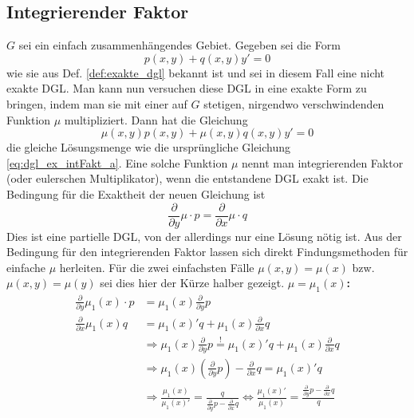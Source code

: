 	\subsection{Integrierender Faktor}
	$G$ sei ein einfach zusammenhängendes Gebiet. Gegeben sei die Form
	\begin{equation}
		p(x,y) + q(x,y)y' = 0 \label{eq:dgl_ex_intFakt_a}
	\end{equation} 
	wie sie aus Def. \ref{def:exakte_dgl} bekannt ist und sei in diesem Fall eine nicht exakte DGL. Man kann nun versuchen diese DGL in eine exakte Form zu bringen, indem man sie mit einer auf $G$ stetigen, nirgendwo verschwindenden Funktion $\mu$ multipliziert. Dann hat die Gleichung
	\begin{equation}
		\mu (x,y)p(x,y) + \mu (x,y) q(x,y)y' = 0
	\end{equation}
	die gleiche Lösungsmenge wie die ursprüngliche Gleichung \eqref{eq:dgl_ex_intFakt_a}. \newline
	Eine solche Funktion $\mu$ nennt man integrierenden Faktor (oder eulerschen Multiplikator), wenn die entstandene DGL exakt ist. Die Bedingung für die Exaktheit der neuen Gleichung ist 
	\begin{equation}
		\frac{\partial}{\partial y} \mu \cdot p = \frac{\partial}{\partial x} \mu \cdot q
	\end{equation}
	Dies ist eine partielle DGL, von der allerdings nur eine Lösung nötig ist.\newline
	Aus der Bedingung für den integrierenden Faktor lassen sich direkt Findungsmethoden für einfache $\mu$ herleiten.
	Für die zwei einfachsten Fälle $\mu (x,y) = \mu (x)$ bzw. $\mu (x,y) = \mu (y)$ sei dies hier der Kürze halber gezeigt. 
	\textbf{$\mu = \mu_1 (x)$: } 
	\begin{align}
			\frac{\partial}{\partial y} \mu_1 (x) \cdot p &= \mu_1 (x) \frac{\partial}{\partial y} p \nonumber \\
			\frac{\partial}{\partial x} \mu_1 (x) q &= \mu_1 (x)' q + \mu_1 (x) \frac{\partial}{\partial x} q  \nonumber \\
			&\Rightarrow \mu_1(x) \frac{\partial}{\partial y} p \overset{!}{=} \mu_1 (x)' q + \mu_1 (x) \frac{\partial}{\partial x}q \nonumber \\
			&\Rightarrow \mu_1 (x) \left( \frac{\partial}{\partial y} p\right) - \frac{\partial}{\partial x} q = \mu_1 (x)' q \nonumber \\
			&\Rightarrow \frac{\mu_1 (x)}{\mu_1 (x)'} = \frac{q}{\frac{\partial}{\partial y}p - \frac{\partial}{\partial x}q} \Leftrightarrow \frac{\mu_1 (x)'}{\mu_1 (x)} = \frac{\frac{\partial}{\partial y} p - \frac{\partial}{\partial x} q}{q} \label{eq:dgl_exakt_mu1}
	\end{align}
	
